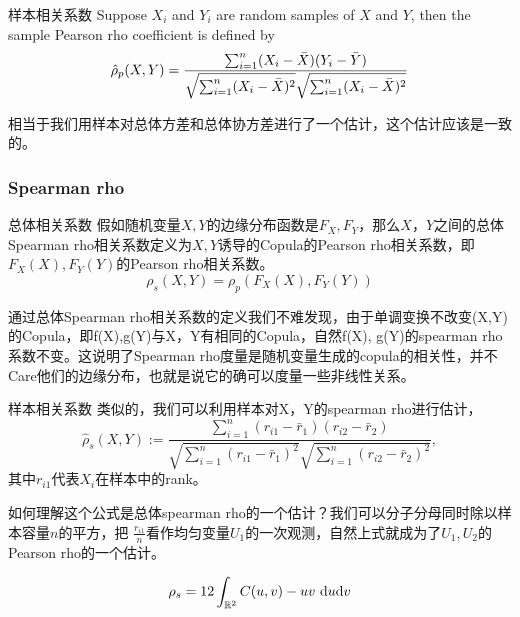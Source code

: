 \documentclass[12pt]{article}
\begin{document}
\begin{sdefinition}{样本相关系数}{}
Suppose $X_i$ and $Y_i$ are random samples of $X$ and $Y$, then the sample Pearson rho 
coefficient is defined by
$$
\hat \rho_p(X,Y) = \frac{{\sum_{i=1}^{n}}(X_i -\bar X)(Y_i -\bar Y)}{\sqrt{{\sum_{i=1}^{n}}(X_i-\bar X)^2}\sqrt{{\sum_{i=1}^{n}}(X_i-\bar X)^2}}
$$
\end{sdefinition}
\begin{sremark}{}{}
	相当于我们用样本对总体方差和总体协方差进行了一个估计，这个估计应该是一致的。
\end{sremark}

\subsubsection{Spearman rho}
\begin{sdefinition}{总体相关系数}{}
假如随机变量$X,Y$的边缘分布函数是$F_X, F_Y$，那么$X，Y$之间的总体Spearman rho相关系数定义为$X,Y$诱导的Copula的Pearson rho相关系数，即$F_X(X), F_Y(Y)$的Pearson rho相关系数。
$$
\rho_s(X,Y) = \rho_p (F_X(X),F_Y(Y))
$$
\end{sdefinition}
\begin{sremark}{}{}
	通过总体Spearman rho相关系数的定义我们不难发现，由于单调变换不改变(X,Y)的Copula，即f(X),g(Y)与X，Y有相同的Copula，自然f(X), g(Y)的spearman rho系数不变。这说明了Spearman rho度量是随机变量生成的copula的相关性，并不Care他们的边缘分布，也就是说它的确可以度量一些非线性关系。
\end{sremark}

\begin{sdefinition}{样本相关系数}{}
类似的，我们可以利用样本对X，Y的spearman rho进行估计，
$$
\hat{\rho}_s\left(X, Y\right):=\frac{\sum_{i=1}^n\left(r_{i 1}-\bar{r}_1\right)\left(r_{i 2}-\bar{r}_2\right)}{\sqrt{\sum_{i=1}^n\left(r_{i 1}-\bar{r}_1\right)^2} \sqrt{\sum_{i=1}^n\left(r_{i 2}-\bar{r}_2\right)^2}},
$$
其中$r_{i1}$代表$X_i$在样本中的rank。
\end{sdefinition}
\begin{sremark}{}{}
如何理解这个公式是总体spearman rho的一个估计？我们可以分子分母同时除以样本容量$n$的平方，把
$\frac{r_{i1}}{n}$看作均匀变量$U_1$的一次观测，自然上式就成为了$U_1,U_2$的Pearson rho的一个估计。	
\end{sremark}

\begin{stheorem}{}{}
$$
\rho_s =12\int_{\mathbb{R}^2} C(u, v)-uv \ \mathrm{d} u \mathrm{d} v  
$$
\end{stheorem}
\end{document}
